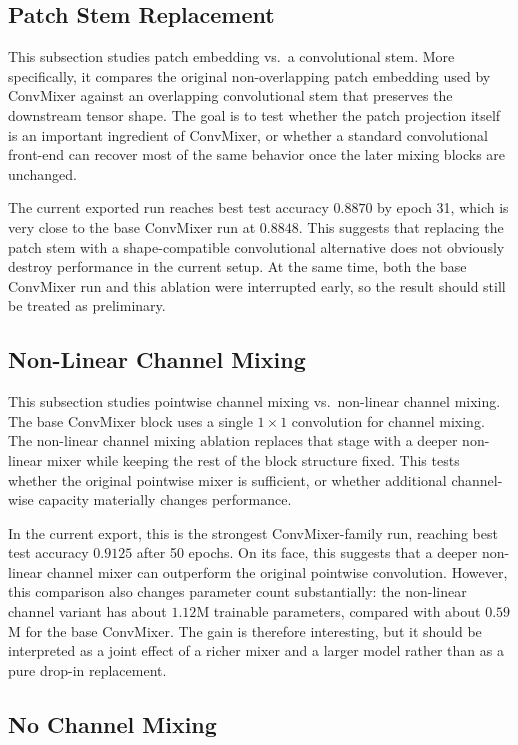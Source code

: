 \subsection{Patch Stem Replacement}

This subsection studies patch embedding vs.\ a convolutional stem. More specifically, it compares the original non-overlapping patch embedding used by ConvMixer against an overlapping convolutional stem that preserves the downstream tensor shape. The goal is to test whether the patch projection itself is an important ingredient of ConvMixer, or whether a standard convolutional front-end can recover most of the same behavior once the later mixing blocks are unchanged.

The current exported run reaches best test accuracy $0.8870$ by epoch 31, which is very close to the base ConvMixer run at $0.8848$. This suggests that replacing the patch stem with a shape-compatible convolutional alternative does not obviously destroy performance in the current setup. At the same time, both the base ConvMixer run and this ablation were interrupted early, so the result should still be treated as preliminary.

\subsection{Non-Linear Channel Mixing}

This subsection studies pointwise channel mixing vs.\ non-linear channel mixing. The base ConvMixer block uses a single $1 \times 1$ convolution for channel mixing. The non-linear channel mixing ablation replaces that stage with a deeper non-linear mixer while keeping the rest of the block structure fixed. This tests whether the original pointwise mixer is sufficient, or whether additional channel-wise capacity materially changes performance.

In the current export, this is the strongest ConvMixer-family run, reaching best test accuracy $0.9125$ after 50 epochs. On its face, this suggests that a deeper non-linear channel mixer can outperform the original pointwise convolution. However, this comparison also changes parameter count substantially: the non-linear channel variant has about $1.12$M trainable parameters, compared with about $0.59$M for the base ConvMixer. The gain is therefore interesting, but it should be interpreted as a joint effect of a richer mixer and a larger model rather than as a pure drop-in replacement.

\subsection{No Channel Mixing}


